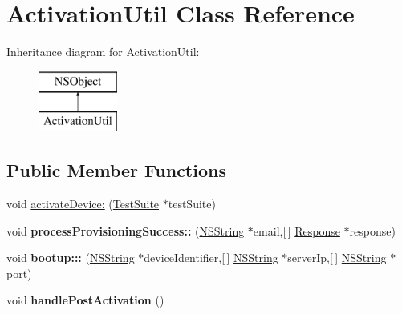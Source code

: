 \hypertarget{interface_activation_util}{
\section{\-Activation\-Util \-Class \-Reference}
\label{interface_activation_util}
}
\-Inheritance diagram for \-Activation\-Util\-:\begin{figure}[H]
\begin{center}
\leavevmode
\includegraphics[height=2.000000cm]{interface_activation_util}
\end{center}
\end{figure}
\subsection*{\-Public \-Member \-Functions}
\begin{DoxyCompactItemize}
\item 
void \hyperlink{interface_activation_util_ab29ad171327263ac5eb0d706e51277e8}{activate\-Device\-:} (\hyperlink{interface_test_suite}{\-Test\-Suite} $\ast$test\-Suite)
\item 
\hypertarget{interface_activation_util_a850a35be430a608b4eaf83c5b9ce348f}{
void {\bfseries process\-Provisioning\-Success\-::} (\hyperlink{class_n_s_string}{\-N\-S\-String} $\ast$email,\mbox{[}$\,$\mbox{]} \hyperlink{interface_response}{\-Response} $\ast$response)}
\label{interface_activation_util_a850a35be430a608b4eaf83c5b9ce348f}

\item 
\hypertarget{interface_activation_util_ad68ac1f345e6c2573b40cba871cf64a0}{
void {\bfseries bootup\-:::} (\hyperlink{class_n_s_string}{\-N\-S\-String} $\ast$device\-Identifier,\mbox{[}$\,$\mbox{]} \hyperlink{class_n_s_string}{\-N\-S\-String} $\ast$server\-Ip,\mbox{[}$\,$\mbox{]} \hyperlink{class_n_s_string}{\-N\-S\-String} $\ast$port)}
\label{interface_activation_util_ad68ac1f345e6c2573b40cba871cf64a0}

\item 
\hypertarget{interface_activation_util_a932cc9f75e48c2e95cc4deb7464d75a9}{
void {\bfseries handle\-Post\-Activation} ()}
\label{interface_activation_util_a932cc9f75e48c2e95cc4deb7464d75a9}

\end{DoxyCompactItemize}

